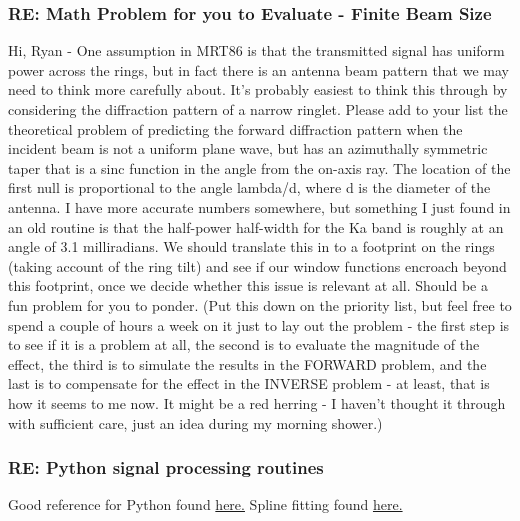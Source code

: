 \documentclass[crop=false,class=book]{standalone}
\begin{document}
\subsubsection{\footnotesize RE: Math Problem for you to Evaluate - Finite Beam Size}
Hi, Ryan - One assumption in MRT86 is that the transmitted signal has uniform power across the rings, but in fact there is an antenna beam pattern that we may need to think more carefully about. It's probably easiest to think this through by considering the diffraction pattern of a narrow ringlet. Please add to your list the theoretical problem of predicting the forward diffraction pattern when the incident beam is not a uniform plane wave, but has an azimuthally symmetric taper that is a sinc function in the angle from the on-axis ray. The location of the first null is proportional to the angle lambda/d, where d is the diameter of the antenna. I have more accurate numbers somewhere, but something I just found in an old routine is that the half-power half-width for the Ka band is roughly at an angle of 3.1 milliradians. We should translate this in to a footprint on the rings (taking account of the ring tilt) and see if our window functions encroach beyond this footprint, once we decide whether this issue is relevant at all. Should be a fun problem for you to ponder.
(Put this down on the priority list, but feel free to spend a couple of hours a week on it just to lay out the problem - the first step is to see if it is a problem at all, the second is to evaluate the magnitude of the effect, the third is to simulate the results in the FORWARD problem, and the last is to compensate for the effect in the INVERSE problem - at least, that is how it seems to me now. It might be a red herring - I haven't thought it through with sufficient care, just an idea during my morning shower.)
\subsubsection{\footnotesize RE: Python signal processing routines}
Good reference for Python found \href{https://docs.scipy.org/doc/scipy/reference/signal.html}{here.} Spline fitting found \href{https://docs.scipy.org/doc/scipy/reference/generated/scipy.interpolate.splrep.html}{here.}
\end{document}
